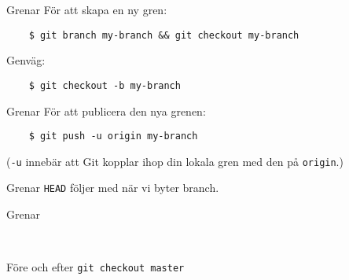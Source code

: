 \documentclass[11pt,xetex]{beamer}
\begin{document}
\begin{frame}[fragile]{Grenar}
  \Large
  För att skapa en ny gren:

  \begin{verbatim}
    $ git branch my-branch && git checkout my-branch
  \end{verbatim}

  Genväg:

  \begin{verbatim}
    $ git checkout -b my-branch
  \end{verbatim}
\end{frame}

\begin{frame}[fragile]{Grenar}
  \Large
  För att publicera den nya grenen:

  \begin{verbatim}
    $ git push -u origin my-branch
  \end{verbatim}

  \scriptsize
  (\texttt{-u} innebär att Git kopplar ihop din lokala gren med den
  på \texttt{origin}.)
\end{frame}

\begin{frame}{Grenar}
  \Large
  \texttt{HEAD} följer med när vi byter branch.
\end{frame}

\begin{frame}{Grenar}
  \captionsetup{type=table}
  \begin{subfigure}[t]{0.5\textwidth}
    \centering
  \end{subfigure}%
  ~
  \begin{subfigure}[t]{0.5\textwidth}
    \centering
  \end{subfigure}

  \center
  Före och efter \texttt{git checkout master}
\end{frame}
\end{document}
